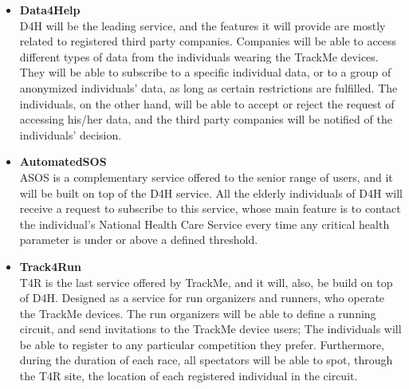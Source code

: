\documentclass[12pt]{report}
\begin{document}
\begin{itemize}
\item{\textbf{Data4Help}}
\\D4H will be the leading service, and the features it will provide are mostly related to registered third party companies. Companies will be able to access different types of data from the individuals wearing the TrackMe devices. They will be able to subscribe to a specific individual data, or to a group of anonymized individuals' data, as long as certain restrictions are fulfilled. The individuals, on the other hand, will be able to accept or reject the request of accessing his/her data, and the third party companies will be notified of the individuals' decision.

\item{\textbf{AutomatedSOS}}
\\ ASOS is a complementary service offered to the senior range of users, and it will be built on top of the D4H service. All the elderly individuals of D4H will receive a request to subscribe to this service, whose main feature is to contact the individual's National Health Care Service every time any critical health parameter is under or above a defined threshold. 

\item{\textbf{Track4Run}}
\\T4R is the last service offered by TrackMe, and it will, also, be build on top of D4H. Designed as a service for run organizers and runners, who operate the TrackMe devices. The run organizers will be able to define a running circuit, and send invitations to the TrackMe device users; The individuals will be able to register to any particular competition they prefer. Furthermore, during the duration of each race, all spectators will be able to spot, through the T4R site, the location of each registered individual in the circuit.
\end{itemize}
\end{document}
